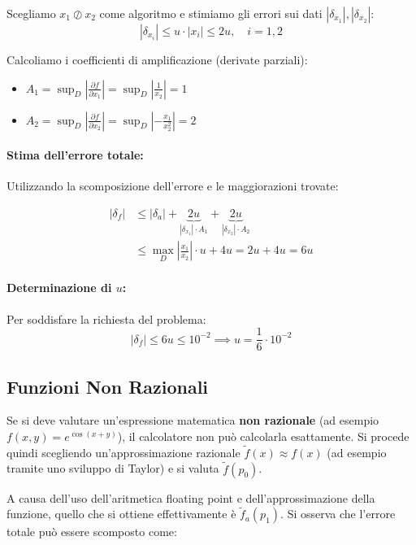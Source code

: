 \documentclass[a4paper,12pt]{article}
\begin{document}
	 \medskip
	 \noindent
	 Scegliamo $x_1 \oslash x_2$ come algoritmo e stimiamo gli errori sui dati $|\delta_{x_1}|, |\delta_{x_2}|$:
	 \[ |\delta_{x_i}| \leqslant u \cdot |x_i| \leqslant 2u, \quad i = 1, 2 \]
	 
	 \noindent
	 Calcoliamo i coefficienti di amplificazione (derivate parziali):
	 \begin{itemize}
	 	\item $A_1 = \sup_{D} \left| \frac{\partial f}{\partial x_1} \right| = \sup_{D} \left| \frac{1}{x_2} \right| = 1$
	 	\item $A_2 = \sup_{D} \left| \frac{\partial f}{\partial x_2} \right| = \sup_{D} \left| -\frac{x_1}{x_2^2} \right| = 2$
	 \end{itemize}
	 
	 \paragraph{Stima dell'errore totale:}
	 Utilizzando la scomposizione dell'errore e le maggiorazioni trovate:
	 
	 \[
	 \begin{aligned}
	 	|\delta_f| &\leqslant |\delta_a| + \underbrace{2u}_{|\delta_{x_1}| \cdot A_1} + \underbrace{2u}_{|\delta_{x_2}| \cdot A_2} \\
	 	&\leqslant \max_{D} \left| \frac{x_1}{x_2} \right| \cdot u + 4u = 2u + 4u = 6u
	 \end{aligned}
	 \]
	 
	 \paragraph{Determinazione di $u$:}
	 Per soddisfare la richiesta del problema:
	 \[ |\delta_f| \leqslant 6u \leqslant 10^{-2} \implies u = \frac{1}{6} \cdot 10^{-2} \]
	 
	 \subsection{Funzioni Non Razionali}
	 
	 Se si deve valutare un'espressione matematica \textbf{non razionale} (ad esempio $f(x,y) = e^{\cos(x+y)}$), il calcolatore non può calcolarla esattamente. Si procede quindi scegliendo un'approssimazione razionale $\tilde{f}(x) \approx f(x)$ (ad esempio tramite uno sviluppo di Taylor) e si valuta $\tilde{f}(p_0)$.
	 
	 A causa dell'uso dell'aritmetica floating point e dell'approssimazione della funzione, quello che si ottiene effettivamente è $\tilde{f}_a(p_1)$. Si osserva che l'errore totale può essere scomposto come:
	 
\end{document}
